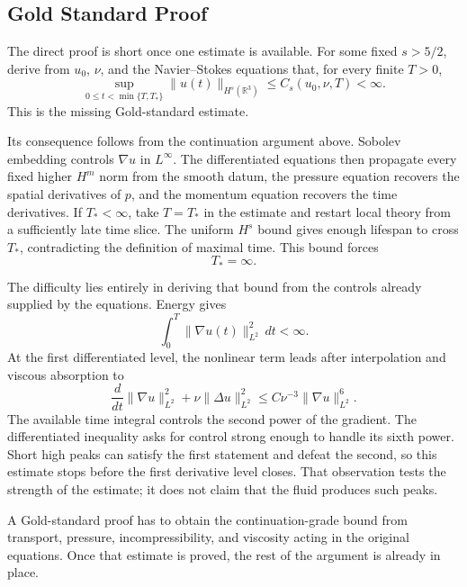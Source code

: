 \subsection{Gold Standard Proof}\label{sub:GoldStandardProof}

The direct proof is short once one estimate is available.
For some fixed \(s>5/2\), derive from \(u_0\), \(\nu\), and the Navier--Stokes equations that, for every finite \(T>0\),
\[
  \sup_{0\leq t<\min\{T,T_*\}}
  \lVert u(t)\rVert_{H^s(\mathbb R^3)}
  \leq
  C_s(u_0,\nu,T)
  <
  \infty.
\]
This is the missing Gold-standard estimate.

Its consequence follows from the continuation argument above.
Sobolev embedding controls \(\nabla u\) in \(L^\infty\).
The differentiated equations then propagate every fixed higher \(H^m\) norm from the smooth datum, the pressure equation recovers the spatial derivatives of \(p\), and the momentum equation recovers the time derivatives.
If \(T_*<\infty\), take \(T=T_*\) in the estimate and restart local theory from a sufficiently late time slice.
The uniform \(H^s\) bound gives enough lifespan to cross \(T_*\), contradicting the definition of maximal time.
This bound forces
\[
  T_*=\infty.
\]

The difficulty lies entirely in deriving that bound from the controls already supplied by the equations.
Energy gives
\[
  \int_0^T
  \lVert\nabla u(t)\rVert_{L^2}^{2}\,dt
  <
  \infty.
\]
At the first differentiated level, the nonlinear term leads after interpolation and viscous absorption to
\[
  \frac{d}{dt}
  \lVert\nabla u\rVert_{L^2}^{2}
  +
  \nu\lVert\Delta u\rVert_{L^2}^{2}
  \leq
  C\nu^{-3}
  \lVert\nabla u\rVert_{L^2}^{6}.
\]
The available time integral controls the second power of the gradient.
The differentiated inequality asks for control strong enough to handle its sixth power.
Short high peaks can satisfy the first statement and defeat the second, so this estimate stops before the first derivative level closes.
That observation tests the strength of the estimate; it does not claim that the fluid produces such peaks.

A Gold-standard proof has to obtain the continuation-grade bound from transport, pressure, incompressibility, and viscosity acting in the original equations.
Once that estimate is proved, the rest of the argument is already in place.

